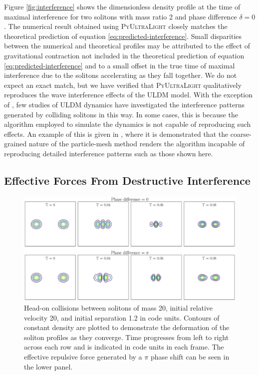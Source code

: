 \documentclass[a4paper,11pt]{article}
\newcommand{\PyUltraLight}{\textsc{PyUltraLight}\xspace}
\newcommand{\re}[1]{\textcolor{blue}{[{\bf RE}: #1]}}
\begin{document}
 Figure \ref{fig:interference} shows the dimensionless density profile at the time of maximal interference for two solitons with mass ratio 2 and phase difference $\delta=0$. The numerical result obtained using \PyUltraLight closely matches the theoretical prediction of equation \ref{eq:predicted-interference}. Small disparities between the numerical and theoretical profiles may be attributed to the effect of gravitational contraction not included in the theoretical prediction of equation \ref{eq:predicted-interference} and to a small offset in the true time of maximal interference due to the solitons accelerating as they fall together. We do not expect an exact match, but we have verified that \PyUltraLight qualitatively reproduces the wave interference effects of the ULDM model. With the exception of \cite{Schwabe2016}, few studies of ULDM dynamics have investigated the interference patterns generated by colliding solitons in this way. In some cases, this is because the algorithm employed to simulate the dynamics is not capable of reproducing such effects. An example of this is given in \cite{Veltmaat2016}, where it is demonstrated that the coarse-grained nature of the particle-mesh method renders the algorithm incapable of reproducing detailed interference patterns such as those shown here. 

\subsection{Effective Forces From Destructive Interference}

\begin{figure}
  \includegraphics[width=1.\textwidth, trim={0 0 0 0},clip]{phase_comparison}
  \caption{Head-on collisions between solitons of mass 20, initial relative velocity 20, and initial separation 1.2 in code units. Contours of constant density are plotted to demonstrate the deformation of the soliton profiles as they converge. Time progresses from left to right across each row and is indicated in code units in each frame. The effective repulsive force generated by a $\pi$ phase shift can be seen in the lower panel.}
  \label{fig:repulsion}
\end{figure}
\end{document}
